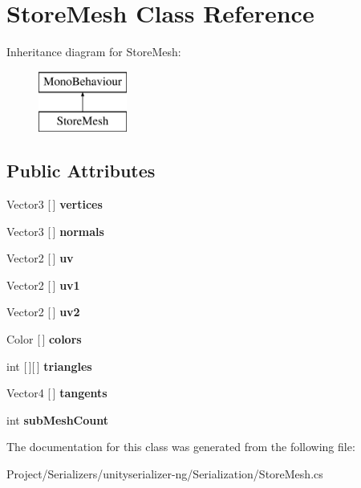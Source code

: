 \hypertarget{class_store_mesh}{}\section{Store\+Mesh Class Reference}
\label{class_store_mesh}
Inheritance diagram for Store\+Mesh\+:\begin{figure}[H]
\begin{center}
\leavevmode
\includegraphics[height=2.000000cm]{class_store_mesh}
\end{center}
\end{figure}
\subsection*{Public Attributes}
\begin{DoxyCompactItemize}
\item 
\mbox{\label{class_store_mesh_a189a0d91c5aae63a798faee218866ff4}} 
Vector3 \mbox{[}$\,$\mbox{]} {\bfseries vertices}
\item 
\mbox{\label{class_store_mesh_a9b85097b5453301bd45d3e1064027916}} 
Vector3 \mbox{[}$\,$\mbox{]} {\bfseries normals}
\item 
\mbox{\label{class_store_mesh_a6511706e2179b6a85a9d871ddb62a95f}} 
Vector2 \mbox{[}$\,$\mbox{]} {\bfseries uv}
\item 
\mbox{\label{class_store_mesh_a4cca669039e64a53c9a70a55704d9afb}} 
Vector2 \mbox{[}$\,$\mbox{]} {\bfseries uv1}
\item 
\mbox{\label{class_store_mesh_a3921a62607d4eedd03aa39a29a9d040c}} 
Vector2 \mbox{[}$\,$\mbox{]} {\bfseries uv2}
\item 
\mbox{\label{class_store_mesh_a1b2a448a6c66bb041162f0a37ee112d5}} 
Color \mbox{[}$\,$\mbox{]} {\bfseries colors}
\item 
\mbox{\label{class_store_mesh_a0ec43c3dd9ca1f815e36ade444497d8d}} 
int \mbox{[}$\,$\mbox{]}\mbox{[}$\,$\mbox{]} {\bfseries triangles}
\item 
\mbox{\label{class_store_mesh_af261f924d969032a763d9e4b0d2b64c4}} 
Vector4 \mbox{[}$\,$\mbox{]} {\bfseries tangents}
\item 
\mbox{\label{class_store_mesh_a2820704c7a35b398242d69c13b79e47e}} 
int {\bfseries sub\+Mesh\+Count}
\end{DoxyCompactItemize}


The documentation for this class was generated from the following file\+:\begin{DoxyCompactItemize}
\item 
Project/\+Serializers/unityserializer-\/ng/\+Serialization/Store\+Mesh.\+cs\end{DoxyCompactItemize}
